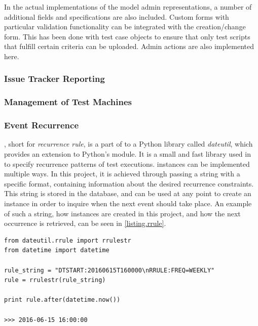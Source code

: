 In the actual implementations of the model admin representations, a number of additional fields and specifications are also included. Custom forms with particular validation functionality can be integrated with the creation/change form. This has been done with test case objects to ensure that only test scripts that fulfill certain criteria can be uploaded. Admin actions are also implemented here.


\subsubsection{Issue Tracker Reporting}

\subsubsection{Management of Test Machines}

\subsubsection{Event Recurrence}
, short for \emph{recurrence rule}, is a part of to a Python library called \emph{dateutil}, which provides an extension to Python's  module. It  is a small and fast library used in \toolname \space to specify recurrence patterns of test executions.  instances can be implemented multiple ways. In this project, it is achieved through passing a string with a specific format, containing information about the desired recurrence constraints. This string is stored in the database, and can be used at any point to create an  instance in order to inquire when the next event should take place. An example of such a string, how  instances are created in this project, and how the next occurrence is retrieved, can be seen in \lstlistingname \space \ref{listing.rrule}.

\vspace{4mm}
\begin{lstlisting}[caption=Recursion Rule, label={listing.rrule}]
from dateutil.rrule import rrulestr
from datetime import datetime

rule_string = "DTSTART:20160615T160000\nRRULE:FREQ=WEEKLY"
rule = rrulestr(rule_string)
 
print rule.after(datetime.now())
 
>>> 2016-06-15 16:00:00
\end{lstlisting}

